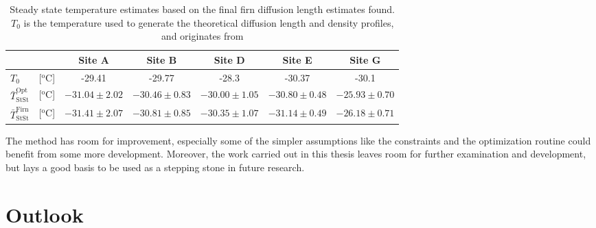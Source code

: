 \documentclass[../../CompleteThesis2/Complete_2ndDraft]{subfiles}
\begin{document}
\begin{table}[ht]
	\centering
	\begin{tabular}{l c|c|c|c|c|c}
		& & Site A & Site B & Site D & Site E & Site G \\
		\hline
		\hline
		$T_0$ & [$^{\text{o}}$C] & -29.41 & -29.77 & -28.3 & -30.37 & -30.1 \\[0.1cm]
		$\bar{T}_{\text{StSt}}^{\text{Opt}}$ & [$^{\text{o}}$C] & $-31.04 \pm 2.02$ & $-30.46 \pm 0.83$ & $-30.00 \pm 1.05$ & $-30.80 \pm 0.48$ & $-25.93 \pm 0.70$ \\[0.5cm]
		$\bar{T}_{\text{StSt}}^{\text{Firn}}$ & [$^{\text{o}}$C] & $-31.41 \pm 2.07$ & $-30.81 \pm 0.85$ & $-30.35 \pm 1.07$ & $-31.14 \pm 0.49$ & $-26.18 \pm 0.71$ \\[0.15cm]
	\end{tabular}
	\caption[Steady State Temperature Estimates]{\small Steady state temperature estimates based on the final firn diffusion length estimates found. $T_0$ is the temperature used to generate the theoretical diffusion length and density profiles, and originates from \cite[add. text]{keylist}}
	\label{Tab:TempResults}
\end{table}	

The method has room for improvement, especially some of the simpler assumptions like the constraints and the optimization routine could benefit from some more development. Moreover, the work carried out in this thesis leaves room for further examination and development, but lays a good basis to be used as a stepping stone in future research.

\section[Outlook]{Outlook}
\label{Sec:Outlook}
\end{document}
